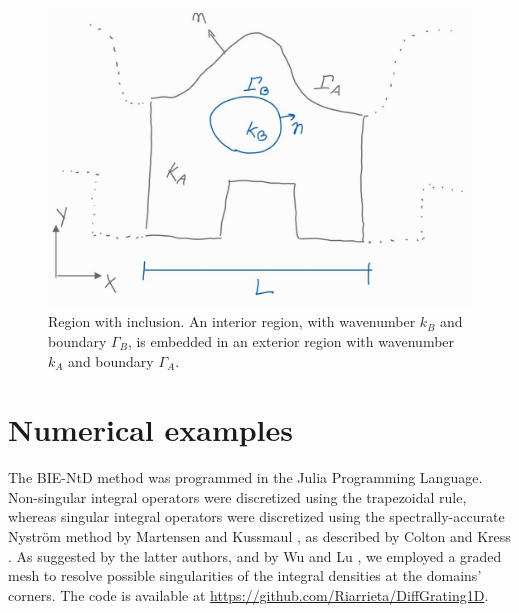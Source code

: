 \documentclass[reprint,amsmath,amssymb,
 aps]{revtex4-2}
\begin{document}
\begin{figure}[h!]
\includegraphics[width=0.6\columnwidth]{figures/bie_inclusion.jpg}
\caption{Region with inclusion. An interior region, with wavenumber $k_B$ and boundary $\Gamma_B$, is embedded in an exterior region with wavenumber $k_A$ and boundary $\Gamma_A$.}
\label{fig:bie_inclusion}
\end{figure}


\section{Numerical examples}
The BIE-NtD method was programmed in the Julia Programming Language. Non-singular integral operators were discretized using the trapezoidal rule, whereas singular integral operators were discretized using the spectrally-accurate Nyström method by Martensen and Kussmaul \cite{martensen1963methode,kussmaul1969numerisches}, as described by Colton and Kress \cite{colton1998inverse}. As suggested by the latter authors, and by Wu and Lu \cite{wu2009analyzing}, we employed a graded mesh to resolve possible singularities of the integral densities at the domains' corners. The code is available at \url{https://github.com/Riarrieta/DiffGrating1D}.
\end{document}
